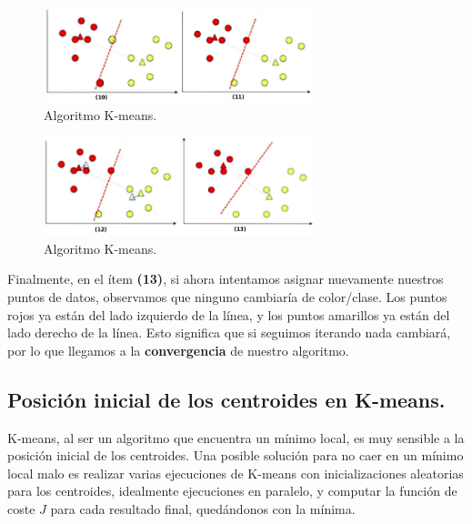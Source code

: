 \documentclass[12pt,a4paper]{article}
\begin{document}
\begin{sloppypar}
\begin{figure}[H]    %
 \centering
 \includegraphics[width=0.7\textwidth]{images/K_Means_5.png}
 \captionsetup{justification=centering,margin=2cm}
 \caption{Algoritmo K-means.}
\end{figure}

\begin{figure}[H]    %
 \centering
 \includegraphics[width=0.7\textwidth]{images/K_Means_6.png}
 \captionsetup{justification=centering,margin=2cm}
 \caption{Algoritmo K-means.}
\end{figure}

Finalmente, en el ítem \textbf{(13)}, si ahora intentamos asignar nuevamente nuestros puntos de datos, observamos que ninguno cambiaría de color/clase. Los puntos rojos ya están del lado izquierdo de la línea, y los puntos amarillos ya están del lado derecho de la línea. Esto significa que si seguimos iterando nada cambiará, por lo que llegamos a la \textbf{convergencia} de nuestro algoritmo.

\cleardoublepage

\subsection{Posición inicial de los centroides en K-means.}\label{anexo_pos_inic_centroides}

K-means, al ser un algoritmo que encuentra un mínimo local, es muy sensible a la posición inicial de los centroides. Una posible solución para no caer en un mínimo local malo es realizar varias ejecuciones de K-means con inicializaciones aleatorias para los centroides, idealmente ejecuciones en paralelo, y computar la función de coste $J$ para cada resultado final, quedándonos con la mínima. 


\end{sloppypar}
\end{document}
